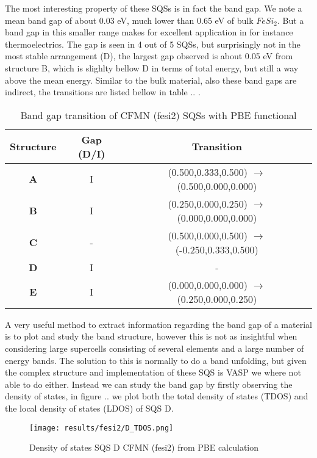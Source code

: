 The most interesting property of these SQSs is in fact the band gap. We note a mean band gap of about 0.03 eV, much lower than 0.65 eV of bulk $FeSi_2$. But a band gap in this smaller range makes for  excellent application in for instance thermoelectrics. The gap is seen in 4 out of 5 SQSs, but surprisingly not in the most stable arrangement (D), the largest gap observed is about 0.05 eV from structure B, which is slighlty bellow D in terms of total energy, but still a way above the mean energy. Similar to the bulk material, also these band gaps are indirect, the transitions are listed bellow in table .. .     

\begin{table}[H]
\centering
\begin{tabular}{@{}ccc@{}}
\toprule
Structure  & Gap (D/I) & Transition                              \\ \midrule
\textbf{A} & I         & (0.500,0.333,0.500) $\rightarrow$ (0.500,0.000,0.000)  \\
\textbf{B} & I         & (0.250,0.000,0.250) $\rightarrow$ (0.000,0.000,0.000)  \\
\textbf{C} & -         & (0.500,0.000,0.500) $\rightarrow$ (-0.250,0.333,0.500) \\
\textbf{D} & I         & -                                        \\
\textbf{E} & I         & (0.000,0.000,0.000) $\rightarrow$ (0.250,0.000,0.250)  \\ \bottomrule
\end{tabular}
\caption{Band gap transition of CFMN (fesi2) SQSs with PBE functional}
\end{table}

A very useful method to extract information regarding the band gap of a material is to plot and study the band structure, however this is not as insightful when considering large supercells consisting of several elements and a  large number of energy bands. The solution to this is normally to do a band unfolding, but given the complex structure and implementation of these SQS is VASP we where not able to do either. Instead we can study the band gap by firstly observing the density of states, in figure .. we plot both the total density of states (TDOS) and the local density of states (LDOS) of SQS D.

\begin{figure}[H]
	\centering
	\texttt{[image: results/fesi2/D\_TDOS.png]}
	\caption{Density of states SQS D CFMN (fesi2) from PBE calculation}
\end{figure}


